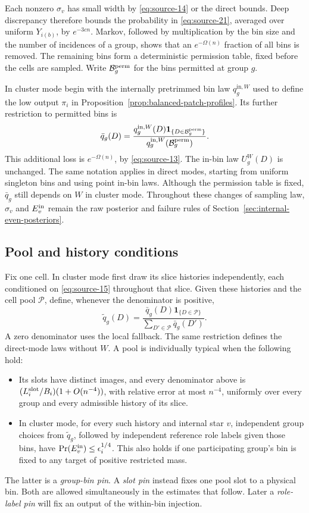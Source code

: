 Each nonzero \(\sigma_v\) has small width by \eqref{eq:source-14} or
the direct bounds. Deep discrepancy therefore bounds the probability in
\eqref{eq:source-21}, averaged over uniform \(Y_{i(b)}\), by
\(e^{-3cn}\). Markov, followed by multiplication by the bin size and
the number of incidences of a group, shows that an \(e^{-\Omega(n)}\)
fraction of all bins is removed. The remaining bins form a deterministic
permission table, fixed before the cells are sampled. Write
\(\mathcal B_g^{\rm perm}\) for the bins permitted at group \(g\).

In cluster mode begin with the internally pretrimmed bin law
\(q_g^{\mathrm{in},W}\) used to define the low output \(\pi_i\) in
Proposition~\ref{prop:balanced-patch-profiles}. Its further restriction to
permitted bins is
\[
 \bar q_g(D)=
 \frac{q_g^{\mathrm{in},W}(D)\mathbf1_{\{D\in\mathcal B_g^{\rm perm}\}}}
      {q_g^{\mathrm{in},W}(\mathcal B_g^{\rm perm})}.
\]
This additional loss is \(e^{-\Omega(n)}\), by \eqref{eq:source-13}.
The in-bin law \(U_g^W(D)\) is unchanged. The same notation applies in
direct modes, starting from uniform singleton bins and using point in-bin
laws. Although the permission table is fixed, \(\bar q_g\) still depends
on \(W\) in cluster mode. Throughout these changes of sampling law,
\(\sigma_v\) and \(E_v^{\rm in}\) remain the raw posterior and failure
rules of Section~\ref{sec:internal-even-posteriors}.

\subsection{Pool and history conditions}
\label{sec:pool-and-history-conditions}

Fix one cell. In cluster mode first draw its slice histories independently,
each conditioned on \eqref{eq:source-15} throughout that slice. Given
these histories and the cell pool \(\mathcal P\), define, whenever the
denominator is positive,
\[
 \widetilde q_g(D)=
 \frac{\bar q_g(D)\mathbf1_{\{D\in\mathcal P\}}}
      {\sum_{D'\in\mathcal P}\bar q_g(D')}.
\]
A zero denominator uses the local fallback. The same restriction defines
the direct-mode laws without \(W\).
A pool is individually typical when the following hold:
\begin{itemize}
\item Its slots have distinct images, and every denominator above is
\((L_i^{\rm slot}/B_i)(1+O(n^{-4}))\), with relative error at most
\(n^{-4}\), uniformly over every group and every admissible history of
its slice.
\item In cluster mode, for every such history and internal star \(v\),
independent group choices from \(\widetilde q_g\), followed by independent
reference role labels given those bins, have
\(\Pr(E_v^{\rm in})\le\epsilon_i^{1/4}\). This also holds if one
participating group's bin is fixed to any target of positive restricted
mass.
\end{itemize}
The latter is a \emph{group-bin pin}. A \emph{slot pin} instead fixes one
pool slot to a physical bin. Both are allowed simultaneously in the
estimates that follow. Later a \emph{role-label pin} will fix an output
of the within-bin injection.

